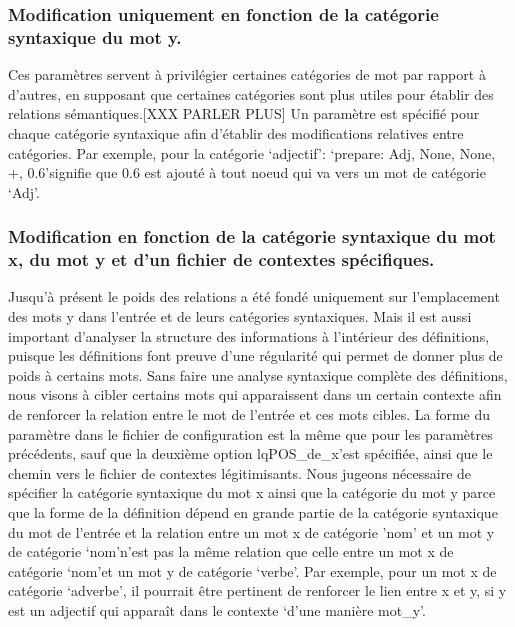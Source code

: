\documentclass[a4paper, 12pt]{article}
\begin{document}
\subsubsection{Modification uniquement en fonction de la catégorie 
syntaxique du mot y.}
Ces paramètres servent à privilégier certaines catégories de mot par rapport à 
d'autres, en supposant que certaines catégories sont plus utiles pour établir 
des relations sémantiques.[XXX PARLER PLUS] Un paramètre est spécifié pour 
chaque catégorie syntaxique afin d'établir des modifications relatives entre 
catégories. Par exemple, pour la catégorie \lq{adjectif}\rq: \lq{prepare: Adj, 
None, None, +, 0.6}\rq signifie que 0.6 est ajouté à tout noeud qui va vers un 
mot de catégorie \lq{Adj}\rq.

\subsubsection{Modification en fonction de la catégorie syntaxique du mot x, du 
mot y et d'un fichier de contextes spécifiques.} 
Jusqu'à présent le poids des relations a été fondé uniquement sur l'emplacement 
des mots y dans l'entrée et de leurs catégories syntaxiques. Mais il est aussi 
important d'analyser la structure des informations à l'intérieur des 
définitions, puisque les définitions font preuve d'une régularité qui permet de 
donner plus de poids à certains mots. Sans faire une analyse syntaxique complète 
des définitions, nous visons à cibler certains mots qui apparaissent dans un 
certain contexte afin de renforcer la relation entre le mot de l'entrée et ces 
mots cibles. La forme du paramètre dans le fichier de configuration est la même 
que pour les paramètres précédents, sauf que la deuxième option 
lq{POS\_de\_x}\rq est spécifiée, ainsi que le chemin vers le fichier de 
contextes légitimisants.
\newline\newline
Nous jugeons nécessaire de spécifier la catégorie syntaxique du mot x ainsi que 
la catégorie du mot y parce que la forme de la définition dépend en grande 
partie de la catégorie syntaxique du mot de l'entrée et la relation entre un 
mot x de catégorie 'nom' et un mot y de catégorie \lq{nom}\rq n'est pas la même 
relation que celle entre un mot x de catégorie \lq{nom}\rq et un mot y de 
catégorie \lq{verbe}\rq.
\newline\newline
Par exemple, pour un mot x de catégorie \lq{adverbe}\rq, il pourrait être 
pertinent de renforcer le lien entre x et y, si y est un adjectif qui apparaît 
dans le contexte \lq{d'une manière mot\_y}\rq.
\end{document}
